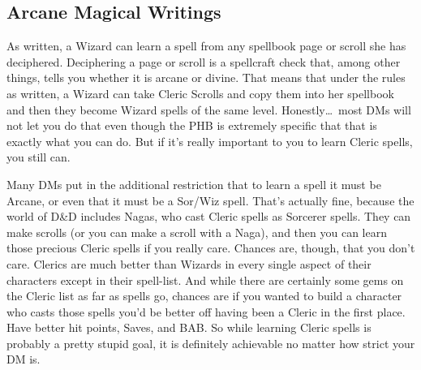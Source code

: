 \subsection{Arcane Magical Writings}

As written, a Wizard can learn a spell from any spellbook page or scroll she has deciphered. Deciphering a page or scroll is a spellcraft check that, among other things, tells you whether it is arcane or divine. That means that under the rules as written, a Wizard can take Cleric Scrolls and copy them into her spellbook and then they become Wizard spells of the same level. Honestly\ldots\  most DMs will not let you do that even though the PHB is extremely specific that that is exactly what you can do. But if it's really important to you to learn Cleric spells, you still can.

Many DMs put in the additional restriction that to learn a spell it must be Arcane, or even that it must be a Sor/Wiz spell. That's actually fine, because the world of D\&D includes Nagas, who cast Cleric spells as Sorcerer spells. They can make scrolls (or you can make a scroll with a Naga), and then you can learn those precious Cleric spells if you really care. Chances are, though, that you don't care. Clerics are much better than Wizards in every single aspect of their characters except in their spell-list. And while there are certainly some gems on the Cleric list as far as spells go, chances are if you wanted to build a character who casts those spells you'd be better off having been a Cleric in the first place. Have better hit points, Saves, and BAB. So while learning Cleric spells is probably a pretty stupid goal, it is definitely achievable no matter how strict your DM is.
